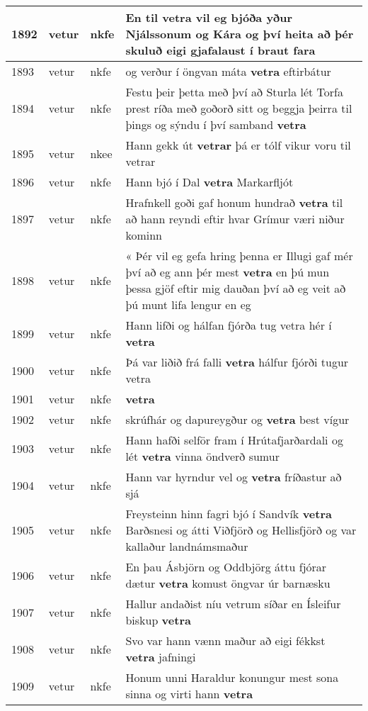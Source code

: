 \documentclass{article}
\begin{document}
\begin{longtable}{p{1cm}|p{1cm}|p{1cm}|p{13cm}}
\hline
1892&vetur&nkfe&En til \textbf{vetra} vil eg bjóða yður Njálssonum og Kára og því heita að þér skuluð eigi gjafalaust í braut fara\\
\hline
1893&vetur&nkfe&og verður í öngvan máta \textbf{vetra} eftirbátur\\
\hline
1894&vetur&nkfe&Festu þeir þetta með því að Sturla lét Torfa prest ríða með goðorð sitt og beggja þeirra til þings og sýndu í því samband \textbf{vetra} \\
\hline
1895&vetur&nkee&Hann gekk út \textbf{vetrar} þá er tólf vikur voru til vetrar\\
\hline
1896&vetur&nkfe&Hann bjó í Dal \textbf{vetra} Markarfljót\\
\hline
1897&vetur&nkfe&Hrafnkell goði gaf honum hundrað \textbf{vetra} til að hann reyndi eftir hvar Grímur væri niður kominn\\
\hline
1898&vetur&nkfe&« Þér vil eg gefa hring þenna er Illugi gaf mér því að eg ann þér mest \textbf{vetra} en þú mun þessa gjöf eftir mig dauðan því að eg veit að þú munt lifa lengur en eg\\
\hline
1899&vetur&nkfe&Hann lifði og hálfan fjórða tug vetra hér í \textbf{vetra} \\
\hline
1900&vetur&nkfe&Þá var liðið frá falli \textbf{vetra} hálfur fjórði tugur vetra\\
\hline
1901&vetur&nkfe& \textbf{vetra} \\
\hline
1902&vetur&nkfe&skrúfhár og dapureygður og \textbf{vetra} best vígur\\
\hline
1903&vetur&nkfe&Hann hafði selför fram í Hrútafjarðardali og lét \textbf{vetra} vinna öndverð sumur\\
\hline
1904&vetur&nkfe&Hann var hyrndur vel og \textbf{vetra} fríðastur að sjá\\
\hline
1905&vetur&nkfe&Freysteinn hinn fagri bjó í Sandvík \textbf{vetra} Barðsnesi og átti Viðfjörð og Hellisfjörð og var kallaður landnámsmaður\\
\hline
1906&vetur&nkfe&En þau Ásbjörn og Oddbjörg áttu fjórar dætur \textbf{vetra} komust öngvar úr barnæsku\\
\hline
1907&vetur&nkfe&Hallur andaðist níu vetrum síðar en Ísleifur biskup \textbf{vetra} \\
\hline
1908&vetur&nkfe&Svo var hann vænn maður að eigi fékkst \textbf{vetra} jafningi\\
\hline
1909&vetur&nkfe&Honum unni Haraldur konungur mest sona sinna og virti hann \textbf{vetra} \\
\hline

\end{longtable}
\end{document}
